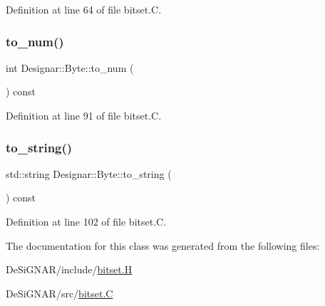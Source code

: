 Definition at line 64 of file bitset.\+C.

\mbox{\label{class_designar_1_1_byte_a1f10a6e5ad399f62c0d53ace68c7e43d}} 
\subsubsection{\texorpdfstring{to\+\_\+num()}{to\_num()}}
{\footnotesize\ttfamily int Designar\+::\+Byte\+::to\+\_\+num (\begin{DoxyParamCaption}{ }\end{DoxyParamCaption}) const}



Definition at line 91 of file bitset.\+C.

\mbox{\label{class_designar_1_1_byte_afddf5962874234208805ece07f31916d}} 
\subsubsection{\texorpdfstring{to\+\_\+string()}{to\_string()}}
{\footnotesize\ttfamily std\+::string Designar\+::\+Byte\+::to\+\_\+string (\begin{DoxyParamCaption}{ }\end{DoxyParamCaption}) const}



Definition at line 102 of file bitset.\+C.



The documentation for this class was generated from the following files\+:\begin{DoxyCompactItemize}
\item 
De\+Si\+G\+N\+A\+R/include/\hyperlink{bitset_8_h}{bitset.\+H}\item 
De\+Si\+G\+N\+A\+R/src/\hyperlink{bitset_8_c}{bitset.\+C}\end{DoxyCompactItemize}
